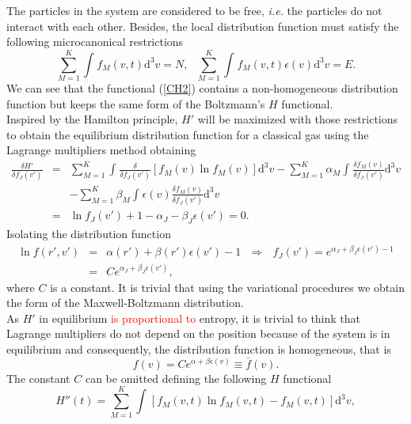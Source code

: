 \documentclass{article}
\begin{document}
The particles in the system are considered to be free, \textit{i.e.} the particles do not interact with each other. Besides, the local distribution function must satisfy the following microcanonical restrictions 
\begin{equation}
    \sum_{M=1}^{K}\int_{}^{}f_M(v,t)\mathrm{d}^3v =N, \ \ \ \sum_{M=1}^{K}\int_{}^{}f_M(v,t)\epsilon(v)\mathrm{d}^3v =E \label{micro}.
\end{equation}
We can see that the functional (\ref{CH2}) contains a non-homogeneous distribution function but keeps the same form of the Boltzmann's $H$ functional.\\
Inspired by the Hamilton principle, $H'$ will be maximized with those restrictions to obtain the equilibrium distribution function for a classical gas using the Lagrange multipliers method obtaining
\begin{eqnarray}
    \frac{\delta H'}{\delta f_J(v')}&=&\sum_{M=1}^{K}\int_{}^{}\frac{\delta}{\delta f_J(v')}\left[f_M(v)\ln f_M(v)  \right]\mathrm{d}^3v -\sum_{M=1}^{K}\alpha_M\int_{}^{}\frac{\delta f_M(v)}{\delta f_J(v')}\mathrm{d}^3v \nonumber \\
    &&-\sum_{M=1}^{K}\beta_M \int_{}^{}\epsilon(v)\frac{\delta f_M(v)}{\delta f_J(v')}\mathrm{d}^3v \nonumber \\
    &=&\ln f_J(v')+1-\alpha_J-\beta_J \epsilon(v')=0.
\end{eqnarray}
Isolating the distribution function 
\begin{eqnarray}
    \ln f(r',v')&=&\alpha(r')+\beta(r') \epsilon(v')-1 \ \ \  \Rightarrow \ \ \ f_J(v')=e^{\alpha_J +\beta_J \epsilon(v')-1} \nonumber \\
    &=&Ce^{\alpha_J+\beta_J \epsilon(v') } \label{relacion1},
\end{eqnarray}
where $C$ is a constant. It is trivial that using the variational procedures we obtain the form of the Maxwell-Boltzmann distribution. \\
As $H'$ in equilibrium \textcolor{red}{is proportional to} entropy, it is trivial to think that Lagrange multipliers do not depend on the position because of the system is in equilibrium and consequently, the distribution function is homogeneous, that is
\begin{equation}
    f(v)=Ce^{\alpha+\beta \epsilon(v)}\equiv \bar{f}(v).
\end{equation}{} 
The constant $C$ can be omitted defining the following $H$ functional
\begin{equation}
   H''(t)=\sum_{M=1}^{K}\int_{}^{} \left[f_M(v,t) \ln f_M(v,t)-f_M(v,t)\right]\mathrm{d}^3v  \label{CH3},
\end{equation}
\end{document}
